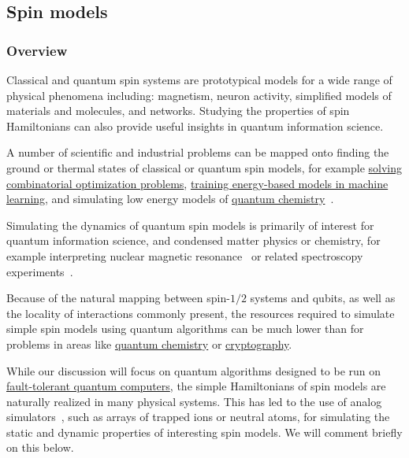 \begin{refsection}

\subsection{Spin models}\label{appl:SpinModels}


\subsubsection*{Overview}
Classical and quantum spin systems are prototypical models for a wide range of physical phenomena including: magnetism, neuron activity, simplified models of materials and molecules, and networks. Studying the properties of spin Hamiltonians can also provide useful insights in quantum information science.

A number of scientific and industrial problems can be mapped onto finding the ground or thermal states of classical or quantum spin models, for example \hyperref[appl:CombOpt]{solving combinatorial optimization problems}, \hyperref[appl:EnergyBasedML]{training energy-based models in machine learning}, and simulating low energy models of \hyperref[appl:ElectronicStructure]{quantum chemistry}~\cite{tazhigulov2022SpinModelsMolecules}. 

Simulating the dynamics of quantum spin models is primarily of interest for quantum information science, and condensed matter physics or chemistry, for example interpreting nuclear magnetic resonance~\cite{sels2020NMR,obrien2021NMRsim} or related spectroscopy experiments~\cite{Chiesa2019NeutronScattering,mcardle2021Muons}.

Because of the natural mapping between spin-$1/2$ systems and qubits, as well as the locality of interactions commonly present, the resources required to simulate simple spin models using quantum algorithms can be much lower than for problems in areas like \hyperref[appl:ElectronicStructure]{quantum chemistry} or \hyperref[appl:BreakingCrypto]{cryptography}.

While our discussion will focus on quantum algorithms designed to be run on \hyperref[prim:QEC]{fault-tolerant quantum computers}, the simple Hamiltonians of spin models are naturally realized in many physical systems. This has led to the use of analog simulators~\cite{bloch2012qSim,georgescu2014qSim}, such as arrays of trapped ions or neutral atoms, for simulating the static and dynamic properties of interesting spin models. We will comment briefly on this below.






\end{refsection}
